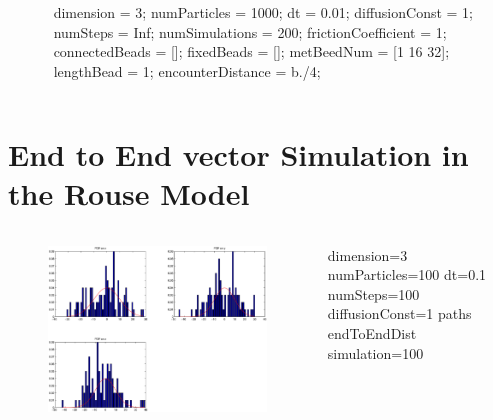 \documentclass {beamer}
\begin{document}
	\begin{frame}
	\begin{columns}
		\begin{column}{0.5\textwidth}
		\begin{figure}
		\end{figure}		
		\end{column}
		\begin{column}{0.3\textwidth}
		dimension = 3;
		numParticles = 1000;
		dt = 0.01;
		diffusionConst = 1;
		numSteps = Inf;
		\alert{numSimulations = 200};
		frictionCoefficient = 1;
		connectedBeads = [];
		fixedBeads = [];
		metBeedNum = [1 16 32];
		lengthBead = 1;
		\alert {encounterDistance = b./4};
	   
		\end{column}
		\end{columns}
     	\end{frame}
\section{End to End vector Simulation in the Rouse Model}
\begin{frame}
	\begin{columns}
		\begin{column}{0.5\textwidth}
		\begin{figure}
		\includegraphics[width=1.3\textwidth]{PDF.eps}
		\end{figure}		
		\end{column}
		\begin{column}{0.3\textwidth}
		dimension=3
		numParticles=100
		dt=0.1
		numSteps=100
		diffusionConst=1
		paths %
		endToEndDist %
		simulation=100
		\end{column}
		\end{columns}
     	\end{frame}
\end{document}
